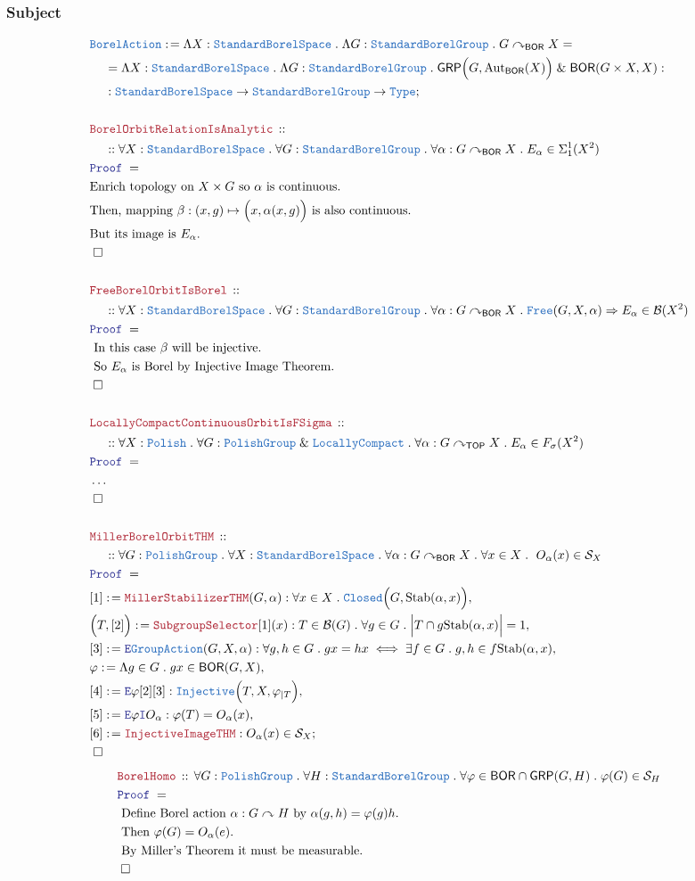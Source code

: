 \documentclass[12pt]{scrartcl}
\newcommand{\TYPE}[1]{\textcolor{NavyBlue}{\mathtt{#1}}}
\newcommand{\LOGIC}[1]{\textcolor{Blue}{\mathtt{#1}}}
\newcommand{\THM}[1]{\textcolor{Maroon}{\mathtt{#1}}}
\renewcommand{\.}{\; . \;}
\newcommand{\de}{: \kern 0.1pc =}
\newcommand{\Theorem}[2]{& \THM{#1} \, :: \, #2 \\ & \Proof = \\ }
\newcommand{\NewLine}{\\ & \kern 1pc}
\newcommand{\Page}[1]{ \begin{align*} #1 \end{align*}   }
\newcommand{\NoProof}{ & \ldots \\ \EndProof}
\newcommand{\Explain}[1]{& \text{#1.} \\}
\renewcommand{\And}{\; \& \;}
\newcommand{\Imply}{\Rightarrow}
\newcommand{\Type}{\TYPE{Type}}
\newcommand{\Aut}{\mathrm{Aut}}
\newcommand{\Inj}{\TYPE{Injective}}
\newcommand{\Say}[3]{& #1 \de #2 : #3, \\}
\newcommand{\SayIn}[3]{& #1 \de #2 \in #3, \\}
\newcommand{\Conclude}[3]{& #1 \de #2 : #3; \\}
\newcommand{\Intro}{\LOGIC{I}}
\newcommand{\Elim}{\LOGIC{E}}
\newcommand{\QED}{\; \square}
\newcommand{\EndProof}{& \QED \\}
\newcommand{\Proof}{\LOGIC{Proof} \; }
\newcommand{\B}{\mathcal{B}}
\newcommand{\Closed}{\TYPE{Closed}}
\newcommand{\LC}{\TYPE{LocallyCompact}}
\newcommand{\TOP}{\mathsf{TOP}}
\newcommand{\Polish}{\TYPE{Polish}}
\newcommand{\SBS}{\TYPE{StandardBorelSpace}}
\newcommand{\BOR}{\mathsf{BOR}}
\renewcommand{\S}{\mathcal{S}}
\newcommand{\Stab}{\mathrm{Stab}}
\newcommand{\ActOn}{\curvearrowright}
\newcommand{\GRP}{\mathsf{GRP}}
\newcommand{\PG}{\TYPE{PolishGroup}}
\newcommand{\SBG}{\TYPE{StandardBorelGroup}}
\renewcommand{\S}{\mathcal{S}}
\begin{document}
\subsubsection{Subject}
\Page{
	\Conclude{\TYPE{BorelAction}}
	{
		\Lambda X : \SBS \.
		\Lambda G : \SBG \.
		G \ActOn_\BOR X 
		= \NewLine =
		\Lambda X : \SBS \.
		\Lambda G : \SBG \.
		\GRP\Big(G, \Aut_\BOR(X)\Big)
		\And
		\BOR(G\times X,X)
	}
	{
		\NewLine :		
		\SBS \to \SBG \to \Type
	}
	\\
	\Theorem{BorelOrbitRelationIsAnalytic}
	{
		\NewLine ::		
		\forall X : \SBS \.
		\forall G : \SBG \.
		\forall \alpha : G \ActOn_\BOR X \. 
		E_\alpha \in \Sigma^1_1(X^2)
	}
	\Explain{Enrich topology on $X \times G$ so $\alpha$ is continuous}
	\Explain{Then, mapping $\beta : (x,g) \mapsto \Big(x,\alpha(x,g)\Big)$ is also continuous}
	\Explain{But its image is $E_\alpha$}
	\EndProof
	\\
	\Theorem{FreeBorelOrbitIsBorel}
	{
		\NewLine ::
		\forall X : \SBS \.
		\forall G : \SBG \.
		\forall \alpha : G \ActOn_\BOR X \. 
		\TYPE{Free}(G,X,\alpha) 
		\Imply
		E_\alpha \in \B(X^2)
	}
	\Explain{ In this case $\beta$ will be injective}
	\Explain{ So $E_\alpha$ is Borel by Injective Image Theorem}
	\EndProof
	\\
	\Theorem{LocallyCompactContinuousOrbitIsFSigma}
	{
		\NewLine ::
		\forall X : \Polish \.
		\forall G : \PG \And \LC \.
		\forall \alpha : G \ActOn_\TOP X \. 
		E_\alpha \in F_\sigma(X^2)
	}
	\NoProof
	\\
	\Theorem{MillerBorelOrbitTHM}
	{
		\NewLine ::
		\forall G : \PG \.
		\forall X : \SBS \.
		\forall \alpha : G \ActOn_\BOR X \.
		\forall x \in X \.
\		O_\alpha(x) \in \S_X
	}	
	\Say{[1]}{\THM{MillerStabilizerTHM}(G,\alpha)}
	{
		\forall x \in X \. \Closed\Big(G, \Stab(\alpha,x)\Big)
	}
	\Say{\Big(T,[2]\Big)}{\THM{SubgroupSelector}[1](x)}
	{
		T \in \B(G) \.
		\forall g \in G \. 
		\Big| T \cap  g\Stab(\alpha,x)\Big| = 1
	}
	\Say{[3]}{\Elim \TYPE{GroupAction}(G,X,\alpha)}
	{
		\forall g,h \in G \. 
		 gx = hx 
		 \iff
		 \exists f \in G \.
		 g,h \in f\Stab(\alpha,x)
	}
	\SayIn{\varphi}{\Lambda g \in G \. gx}{\BOR(G,X)}
	\Say{[4]}{\Elim \varphi [2][3]}
	{
		\Inj\Big(T,X,\varphi_{|T}\Big) 
	}
	\Say{[5]}{\Elim \varphi \Intro O_\alpha}{\varphi(T) = O_\alpha(x) }
	\Conclude{[6]}{\THM{InjectiveImageTHM}}
	{
		O_\alpha(x) \in \S_X
	}
	\EndProof
}
\Page{
	\Theorem{BorelHomo}
	{
		\forall G : \PG \.
		\forall H : \SBG \.
		\forall \varphi \in \BOR \cap \GRP(G,H) \.
		\varphi(G) \in \S_H		
	}
	\Explain{ Define Borel action $\alpha : G \ActOn H$ by $\alpha(g,h) = \varphi(g)h$}
	\Explain{  Then $\varphi(G) = O_\alpha(e)$}
	\Explain{ By Miller's Theorem it must be measurable}
	\EndProof
}
\newpage
\end{document}
